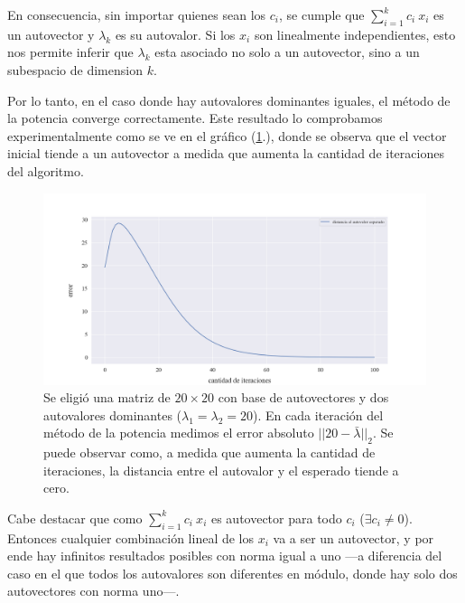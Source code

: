 \vspace{1em}
En consecuencia, sin importar quienes sean los $c_i$, se cumple que $\sum_{i=1}^{k} c_i\ x_i$ es un autovector y $\lambda_k$ es su autovalor. Si los $x_i$ son linealmente independientes, esto nos permite inferir que $\lambda_k$ esta asociado no solo a un autovector, sino a un subespacio de dimension $k$.   

\vspace{1em}
Por lo tanto, en el caso donde hay autovalores dominantes iguales, el método de la potencia converge correctamente. Este resultado lo comprobamos experimentalmente como se ve en el gráfico (\ref{fig:autovalor_repetido}.), donde se observa que el vector inicial tiende a un autovector a medida que aumenta la cantidad de iteraciones del algoritmo.

\vspace{1em}
\begin{figure}[!htbp]
    \includegraphics[scale=0.45]{files/src/.media/op_autovalor_repetido.png}
    \caption{Se eligió una matriz de $20 \times 20$ con base de autovectores y dos autovalores dominantes ($\lambda_1 = \lambda_2 = 20$). En cada iteración del método de la potencia medimos el error absoluto $||20 - \bar{\lambda}||_2$. Se puede observar como, a medida que aumenta la cantidad de iteraciones, la distancia entre el autovalor y el esperado tiende a cero.}
    \label{fig:autovalor_repetido}
\end{figure}

\vspace{1em}
Cabe destacar que como $\sum_{i=1}^{k} c_i\ x_i$ es autovector para todo $c_i$ ($\exists c_i \neq 0$). Entonces cualquier combinación lineal de los $x_i$ va a ser un autovector, y por ende hay infinitos resultados posibles con norma igual a uno ---a diferencia del caso en el que todos los autovalores son diferentes en módulo, donde hay solo dos autovectores con norma uno---.

